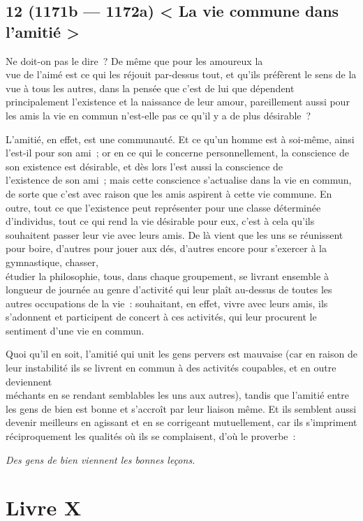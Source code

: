 \documentclass[french,twoside]{book} %
\begin{document}
\subsection[{12 (1171b — 1172a) < La vie commune dans l’amitié >}]{12 (1171b — 1172a) < La vie commune dans l’amitié >}
\noindent Ne doit-on pas le dire ? De même que pour les amoureux la \\
vue de l’aimé est ce qui les réjouit par-dessus tout, et qu’ils préfèrent le sens de la vue à tous les autres, dans la pensée que c’est de lui que dépendent principalement l’existence et la naissance de leur amour, pareillement aussi pour les amis la vie en commun n’est-elle pas ce qu’il y a de plus désirable ?\par
L’amitié, en effet, est une communauté. Et ce qu’un homme est à soi-même, ainsi l’est-il pour son ami ; or en ce qui le concerne personnellement, la conscience de son existence est désirable, et dès lors l’est aussi la conscience de \\
l’existence de son ami ; mais cette conscience s’actualise dans  la vie en commun, de sorte que c’est avec raison que les amis aspirent à cette vie commune. En outre, tout ce que l’existence peut représenter pour une classe déterminée d’individus, tout ce qui rend la vie désirable pour eux, c’est à cela qu’ils souhaitent passer leur vie avec leurs amis. De là vient que les uns se réunissent pour boire, d’autres pour jouer aux dés, d’autres encore pour s’exercer à la gymnastique, chasser, \\
étudier la philosophie, tous, dans chaque groupement, se livrant ensemble à longueur de journée au genre d’activité qui leur plaît au-dessus de toutes les autres occupations de la vie : souhaitant, en effet, vivre avec leurs amis, ils s’adonnent et participent de concert à ces activités, qui leur procurent le sentiment d’une vie en commun.\par
Quoi qu’il en soit, l’amitié qui unit les gens pervers est mauvaise (car en raison de leur instabilité ils se livrent en commun à des activités coupables, et en outre deviennent \\
méchants en se rendant semblables les uns aux autres), tandis que l’amitié entre les gens de bien est bonne et s’accroît par leur liaison même. Et ils semblent aussi devenir meilleurs en agissant et en se corrigeant mutuellement, car ils s’impriment réciproquement les qualités où ils se complaisent, d’où le proverbe :\par
 {\itshape Des gens de bien viennent les bonnes leçons.} 
\section[{Livre X}]{Livre X}\renewcommand{\leftmark}{Livre X}
\end{document}
